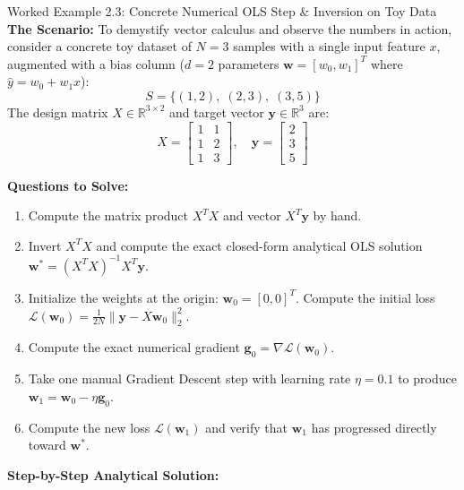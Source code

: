\begin{examplebox}[breakable]{Worked Example 2.3: Concrete Numerical OLS Step \& Inversion on Toy Data}
\label{ex:w02_numerical_ols_step}
\textbf{The Scenario:}
To demystify vector calculus and observe the numbers in action, consider a concrete toy dataset of $N = 3$ samples with a single input feature $x$, augmented with a bias column ($d = 2$ parameters $\mathbf{w} = [w_0, w_1]^T$ where $\hat{y} = w_0 + w_1 x$):
\begin{equation*}
S = \big\{ (1, 2), \; (2, 3), \; (3, 5) \big\}
\end{equation*}
The design matrix $X \in \mathbb{R}^{3 \times 2}$ and target vector $\mathbf{y} \in \mathbb{R}^3$ are:
\begin{equation*}
X = \begin{bmatrix} 1 & 1 \\ 1 & 2 \\ 1 & 3 \end{bmatrix}, \quad \mathbf{y} = \begin{bmatrix} 2 \\ 3 \\ 5 \end{bmatrix}
\end{equation*}

\textbf{Questions to Solve:}
\begin{enumerate}
    \item Compute the matrix product $X^T X$ and vector $X^T \mathbf{y}$ by hand.
    \item Invert $X^T X$ and compute the exact closed-form analytical OLS solution $\mathbf{w}^* = (X^T X)^{-1} X^T \mathbf{y}$.
    \item Initialize the weights at the origin: $\mathbf{w}_0 = [0, 0]^T$. Compute the initial loss $\mathcal{L}(\mathbf{w}_0) = \frac{1}{2N}\|\mathbf{y} - X\mathbf{w}_0\|_2^2$.
    \item Compute the exact numerical gradient $\mathbf{g}_0 = \nabla \mathcal{L}(\mathbf{w}_0)$.
    \item Take one manual Gradient Descent step with learning rate $\eta = 0.1$ to produce $\mathbf{w}_1 = \mathbf{w}_0 - \eta \mathbf{g}_0$.
    \item Compute the new loss $\mathcal{L}(\mathbf{w}_1)$ and verify that $\mathbf{w}_1$ has progressed directly toward $\mathbf{w}^*$.
\end{enumerate}

\tcblower
\textbf{Step-by-Step Analytical Solution:}


\end{examplebox}
